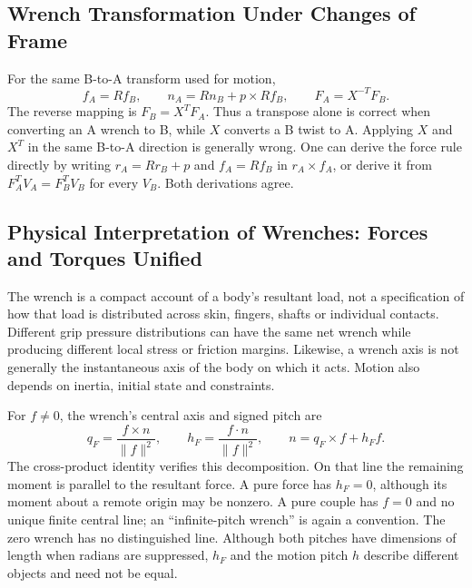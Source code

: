 \subsection{Wrench Transformation Under Changes of Frame}

For the same B-to-A transform used for motion,
\begin{equation}
 f_A=Rf_B,\qquad n_A=Rn_B+p\times Rf_B,
 \qquad F_A=X^{-T}F_B.
\end{equation}
The reverse mapping is $F_B=X^TF_A$. Thus a transpose alone is correct when converting an A wrench to B, while $X$ converts a B twist to A. Applying $X$ and $X^T$ in the same B-to-A direction is generally wrong. One can derive the force rule directly by writing $r_A=Rr_B+p$ and $f_A=Rf_B$ in $r_A\times f_A$, or derive it from $F_A^TV_A=F_B^TV_B$ for every $V_B$. Both derivations agree.

\subsection{Physical Interpretation of Wrenches: Forces and Torques Unified}
\label{sec:wrench_physical_interpretation}
\label{laymans:wrench_unified_motivation}
\label{ex:canonical_wrenches}

The wrench is a compact account of a body's resultant load, not a specification of how that load is distributed across skin, fingers, shafts or individual contacts. Different grip pressure distributions can have the same net wrench while producing different local stress or friction margins. Likewise, a wrench axis is not generally the instantaneous axis of the body on which it acts. Motion also depends on inertia, initial state and constraints.

For $f\ne0$, the wrench's central axis and signed pitch are
\begin{equation}
 q_F=\frac{f\times n}{\|f\|^2},\qquad h_F=\frac{f\cdot n}{\|f\|^2},
 \qquad n=q_F\times f+h_F f.
\end{equation}
The cross-product identity verifies this decomposition. On that line the remaining moment is parallel to the resultant force. A pure force has $h_F=0$, although its moment about a remote origin may be nonzero. A pure couple has $f=0$ and no unique finite central line; an ``infinite-pitch wrench'' is again a convention. The zero wrench has no distinguished line. Although both pitches have dimensions of length when radians are suppressed, $h_F$ and the motion pitch $h$ describe different objects and need not be equal.

